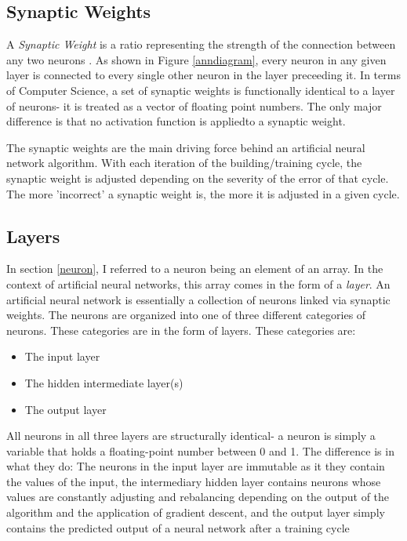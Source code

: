 \documentclass[12pt]{article}
\begin{document}
    \subsection{Synaptic Weights \label{weights}}
        
        A \textit{Synaptic Weight} is a ratio representing the strength of the connection between any two neurons \textcite{shamdasani2017}. As shown in Figure \ref{anndiagram}, every neuron in any given layer is connected to every single other neuron in  the layer preceeding it. In terms of Computer Science, a set of synaptic weights is functionally identical to a layer of neurons- it is treated as a vector of floating point numbers. The only major difference is that no activation function is appliedto a synaptic weight.

        The synaptic weights are the main driving force behind an artificial neural network algorithm. With each iteration of the building/training cycle, the synaptic weight is adjusted depending on the severity of the error of that cycle. The more 'incorrect' a synaptic weight is, the more it is adjusted in a given cycle. 

    \subsection{Layers}

        In section \ref{neuron}, I referred to a neuron being an element of an array. In the context of artificial neural networks, this array comes in the form of a \textit{layer}. An artificial neural network is essentially a collection of neurons linked via synaptic weights. The neurons are organized into one of three different categories of neurons. These categories are in the form of layers. These categories are:

        \begin{itemize}
            \item The input layer
            \item The hidden intermediate layer(s)
            \item The output layer
        \end{itemize}
        
        All neurons in all three layers are structurally identical- a neuron is simply a variable that holds a floating-point number between 0 and 1. The difference is in what they do: The neurons in the input layer are immutable as it they contain the values of the input, the intermediary hidden layer contains neurons whose values are constantly adjusting and rebalancing depending on the output of the algorithm and the application of gradient descent, and the output layer simply contains the predicted output of a neural network after a training cycle
\end{document}
